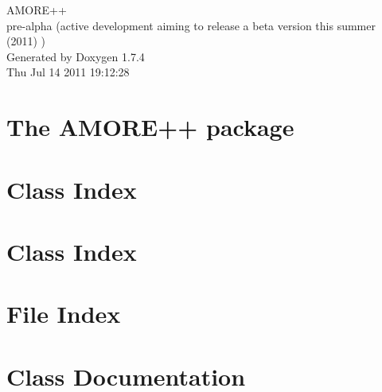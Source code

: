 \documentclass[a4paper]{book}
\begin{document}
\hypersetup{pageanchor=false}
\begin{titlepage}
\vspace*{7cm}
\begin{center}
{\Large AMORE++ \\[1ex]\large pre-\/alpha (active development aiming to release a beta version this summer (2011) ) }\\
\vspace*{1cm}
{\large Generated by Doxygen 1.7.4}\\
\vspace*{0.5cm}
{\small Thu Jul 14 2011 19:12:28}\\
\end{center}
\end{titlepage}
\clearemptydoublepage
{}
\tableofcontents
\clearemptydoublepage
{}
\hypersetup{pageanchor=true}
\chapter{The AMORE++ package}
\label{index}\hypertarget{index}{}
\chapter{Class Index}

\chapter{Class Index}

\chapter{File Index}

\chapter{Class Documentation}
































\end{document}
